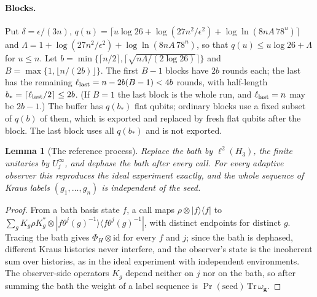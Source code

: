\documentclass[11pt,a4paper]{article}
\theoremstyle{plain}
\newtheorem{lemma}[theorem]{Lemma}
\theoremstyle{definition}
\theoremstyle{remark}
\begin{document}
\paragraph{Blocks.} Put $\delta=\epsilon/(3n)$,
$q(u)=\lceil u\log26+\log(27n^2/\epsilon^2)+\log\ln(8nA\,78^u)\rceil$ and $\Lambda=1+\log(27n^2/\epsilon^2)+\log\ln(8nA\,78^n)$,
so that $q(u)\le u\log26+\Lambda$ for $u\le n$. Let
$b=\min\{\lceil n/2\rceil,\lceil\sqrt{n\Lambda/(2\log26)}\rceil\}$ and $B=\max\{1,\lfloor n/(2b)\rfloor\}$. The first $B-1$ blocks have
$2b$ rounds each; the last has the remaining $\ell_{\rm last}=n-2b(B-1)<4b$ rounds, with half-length
$b_*=\lceil\ell_{\rm last}/2\rceil\le2b$. (If $B=1$ the last block is the whole run, and $\ell_{\rm last}=n$ may be $2b-1$.)
The buffer has $q(b_*)$ flat qubits; ordinary blocks use a fixed subset of $q(b)$ of them, which is exported and replaced
by fresh flat qubits after the block. The last block uses all $q(b_*)$ and is not exported.

\begin{lemma}[The reference process]\label{lem:reference}
Replace the bath by $\ell^2(H_3)$, the finite unitaries by $U_j^\infty$, and dephase the bath after every call. For every
adaptive observer this reproduces the ideal experiment exactly, and the whole sequence of Kraus labels $(g_1,\dots,g_n)$ is
independent of the seed.
\end{lemma}

\begin{proof}
From a bath basis state $f$, a call maps $\rho\otimes|f\rangle\langle f|$ to $\sum_gK_g\rho K_g^*\otimes|f\theta^j(g)^{-1}\rangle\langle f\theta^j(g)^{-1}|$,
with distinct endpoints for distinct $g$. Tracing the bath gives $\Phi_H\otimes\mathrm{id}$ for every $f$ and $j$; since the bath is
dephased, different Kraus histories never interfere, and the observer's state is the incoherent sum over histories, as in
the ideal experiment with independent environments. The observer-side operators $K_g$ depend neither on $j$ nor on the
bath, so after summing the bath the weight of a label sequence is $\Pr(\text{seed})\,\mathrm{Tr}\,\omega_{\mathbf g}$.
\end{proof}
\end{document}
